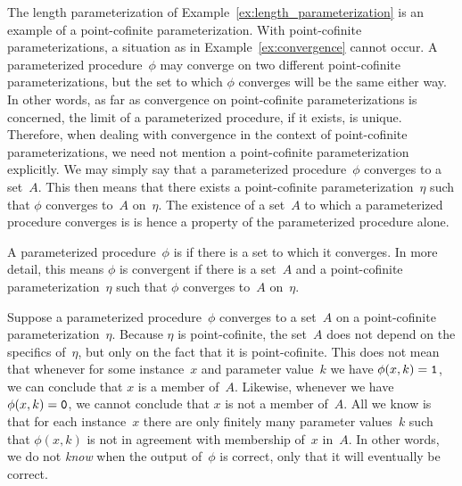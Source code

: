 The length parameterization of Example~\ref{ex:length_parameterization} is an example of a point-cofinite parameterization.
With point-cofinite parameterizations, a situation as in Example~\ref{ex:convergence} cannot occur.
A parameterized procedure~$\phi$ may converge on two different point-cofinite parameterizations, but the set to which $\phi$ converges will be the same either way.
In other words, as far as convergence on point-cofinite parameterizations is concerned, the limit of a parameterized procedure, if it exists, is unique.
Therefore, when dealing with convergence in the context of point-cofinite parameterizations, we need not mention a point-cofinite parameterization explicitly.
We may simply say that a parameterized procedure~$\phi$ converges to a set~$A$.
This then means that there exists a point-cofinite parameterization~$\eta$ such that $\phi$ converges to~$A$ on~$\eta$.
The existence of a set~$A$ to which a parameterized procedure converges is is hence a property of the parameterized procedure alone.
\begin{definition}
\label{def:convergent}%
  A parameterized procedure~$\phi$ is  if there is a set to which it converges.
  In more detail, this means $\phi$ is convergent if there is a set~$A$ and a point-cofinite parameterization~$\eta$ such that $\phi$ converges to~$A$ on~$\eta$.
\end{definition}

Suppose a parameterized procedure~$\phi$ converges to a set~$A$ on a point-cofinite parameterization~$\eta$.
Because $\eta$ is point-cofinite, the set~$A$ does not depend on the specifics of~$\eta$, but only on the fact that it is point-cofinite.
This does not mean that whenever for some instance~$x$ and parameter value~$k$ we have $\phi(x, k) = \textnormal{\texttt{1}}$, we can conclude that $x$ is a member of~$A$.
Likewise, whenever we have $\phi(x, k) = \textnormal{\texttt{0}}$, we cannot conclude that $x$ is not a member of~$A$.
All we know is that for each instance~$x$ there are only finitely many parameter values~$k$ such that $\phi(x, k)$ is not in agreement with membership of~$x$ in~$A$.
In other words, we do not \emph{know} when the output of~$\phi$ is correct, only that it will eventually be correct.

